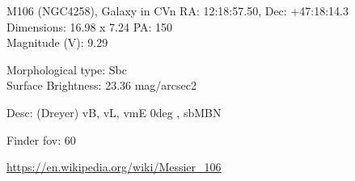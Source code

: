 \begin{block}{M106 (NGC4258), Galaxy in CVn}
    RA: 12:18:57.50, Dec: +47:18:14.3 \\ 
    Dimensions: 16.98 x 7.24 PA: 150 \\ 
    Magnitude (V): 9.29

    Morphological type: Sbc \\ 
    Surface Brightness: 23.36 mag/arcsec2 

    Desc: (Dreyer) vB, vL, vmE 0deg , sbMBN 

    Finder fov: 60 

    \url{https://en.wikipedia.org/wiki/Messier_106} 
\end{block}